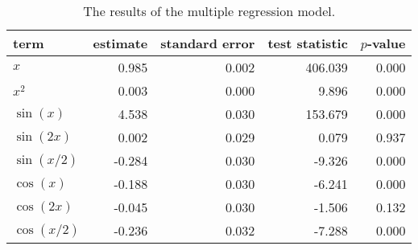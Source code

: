 \begin{table}[t]

\caption{\label{tab:multiple-regression}The results of the multiple regression model.}
\centering
\begin{tabular}{lrrrr}
\toprule
term & estimate & standard error & test statistic & \(p\)-value\\
\midrule
\(x\) & 0.985 & 0.002 & 406.039 & 0.000\\
\(x^2\) & 0.003 & 0.000 & 9.896 & 0.000\\
\(\sin(x)\) & 4.538 & 0.030 & 153.679 & 0.000\\
\(\sin(2x)\) & 0.002 & 0.029 & 0.079 & 0.937\\
\(\sin(x/2)\) & -0.284 & 0.030 & -9.326 & 0.000\\
\(\cos(x)\) & -0.188 & 0.030 & -6.241 & 0.000\\
\(\cos(2x)\) & -0.045 & 0.030 & -1.506 & 0.132\\
\(\cos(x/2)\) & -0.236 & 0.032 & -7.288 & 0.000\\
\bottomrule
\end{tabular}
\end{table}